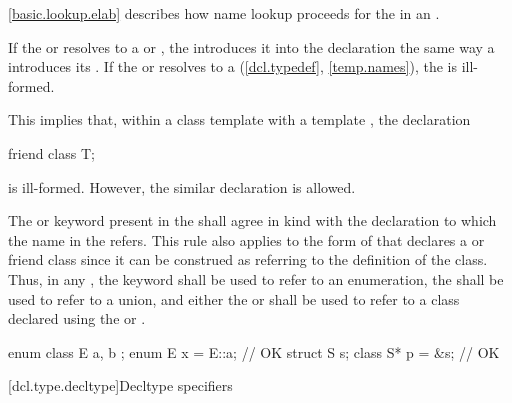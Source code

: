 \pnum
\begin{note}
\ref{basic.lookup.elab} describes how name lookup proceeds for the
 in an .
\end{note}
If the  or 
resolves to a  or
, the 
introduces it into the declaration the same way a
 introduces
its .
If the  or  resolves to a
 (\ref{dcl.typedef}, \ref{temp.names}),
the  is ill-formed.
\begin{note}
This implies that, within a class template with a template
 , the declaration
\begin{codeblock}
friend class T;
\end{codeblock}
is ill-formed. However, the similar declaration  is allowed.
\end{note}

\pnum
The  or  keyword
present in the
 shall agree in kind with the
declaration to which the name in the
 refers. This rule also applies to
the form of  that declares a
 or friend class since it can be construed
as referring to the definition of the class. Thus, in any
, the  keyword
shall be
used to refer to an enumeration, the 
 shall be used to refer to a union,
and either the  or 
 shall be used to refer to a class
declared using the  or 
.
\begin{example}
\begin{codeblock}
enum class E { a, b };
enum E x = E::a;                // OK
struct S { } s;
class S* p = &s;                // OK
\end{codeblock}
\end{example}

[dcl.type.decltype]{Decltype specifiers}%
%

